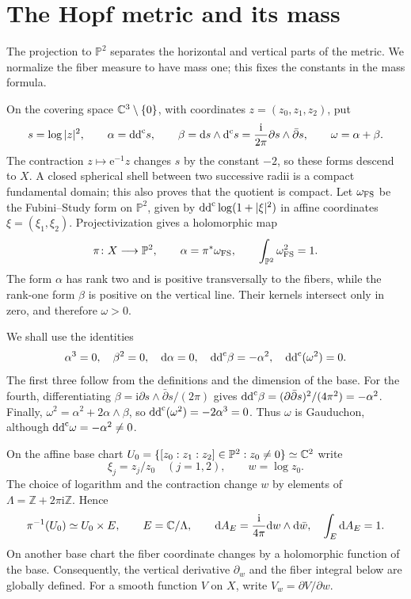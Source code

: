 \section{The Hopf metric and its mass}

The projection to $\mathbb P^2$ separates the horizontal and vertical parts of the metric. We normalize the fiber measure to have mass one; this fixes the constants in the mass formula.

On the covering space $\mathbb C^3\setminus\{0\}$, with coordinates $z=(z_0,z_1,z_2)$, put
\[
 s=\log|z|^2,\qquad
 \alpha=\mathrm{dd}^{\mathrm{c}} s,\qquad
 \beta=\mathrm{d}s\wedge\mathrm d^{\mathrm c} s
       =\frac{\mathrm i}{2\pi}\partial s\wedge\bar\partial s,
 \qquad \omega=\alpha+\beta.
\]
The contraction $z\mapsto\mathrm{e}^{-1}z$ changes $s$ by the constant $-2$, so these forms descend to $X$. A closed spherical shell between two successive radii is a compact fundamental domain; this also proves that the quotient is compact. Let $\omega_{\mathrm{FS}}$ be the Fubini--Study form on $\mathbb P^2$, given by $\mathrm{dd}^{\mathrm{c}}\log(1+|\xi|^2)$ in affine coordinates $\xi=(\xi_1,\xi_2)$. Projectivization gives a holomorphic map
\[
 \pi\colon X\longrightarrow\mathbb P^2,
 \qquad \alpha=\pi^*\omega_{\mathrm{FS}},\qquad
 \int_{\mathbb P^2}\omega_{\mathrm{FS}}^2=1.
\]
The form $\alpha$ has rank two and is positive transversally to the fibers, while the rank-one form $\beta$ is positive on the vertical line. Their kernels intersect only in zero, and therefore $\omega>0$.

We shall use the identities
\begin{equation}\label{eq:hopf-torsion}
 \alpha^3=0,\quad \beta^2=0,\quad \mathrm{d}\alpha=0,
 \quad \mathrm{dd}^{\mathrm{c}}\beta=-\alpha^2,
 \quad \mathrm{dd}^{\mathrm{c}}(\omega^2)=0.
\end{equation}
The first three follow from the definitions and the dimension of the base. For the fourth, differentiating $\beta=\mathrm i\partial s\wedge\bar\partial s/(2\pi)$ gives $\mathrm{dd}^{\mathrm{c}}\beta=(\partial\bar\partial s)^2/(4\pi^2)=-\alpha^2$. Finally,
$\omega^2=\alpha^2+2\alpha\wedge\beta$, so $\mathrm{dd}^{\mathrm{c}}(\omega^2)=-2\alpha^3=0$. Thus $\omega$ is Gauduchon, although $\mathrm{dd}^{\mathrm{c}}\omega=-\alpha^2\ne0$.

On the affine base chart $U_0=\{[z_0:z_1:z_2]\in\mathbb P^2:z_0\ne0\}\simeq\mathbb C^2$ write
\[
 \xi_j=z_j/z_0\quad(j=1,2),\qquad w=\log z_0.
\]
The choice of logarithm and the contraction change $w$ by elements of
$\Lambda=\mathbb Z+2\pi\mathrm i\mathbb Z$. Hence
\[
 \pi^{-1}(U_0)\simeq U_0\times E,\qquad
 E=\mathbb C/\Lambda,\qquad
 \mathrm{d}A_E=\frac{\mathrm i}{4\pi}\mathrm{d}w\wedge \mathrm{d}\bar w,
 \quad\int_E\mathrm{d}A_E=1.
\]
On another base chart the fiber coordinate changes by a holomorphic function of the base. Consequently, the vertical derivative $\partial_w$ and the fiber integral below are globally defined. For a smooth function $V$ on $X$, write $V_w=\partial V/\partial w$.

